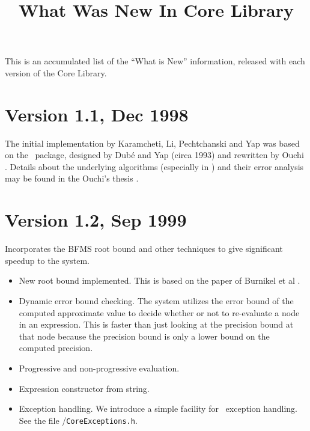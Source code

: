 \documentclass[12pt]{article}
\title{What Was New In Core Library}
\begin{document}
\maketitle

\section*{}
This is an accumulated list of the
``What is New'' information, released with
each version of the Core Library.

\section{Version 1.1, Dec 1998}
The initial implementation
by Karamcheti, Li, Pechtchanski and Yap \cite{klpy:core:98}
was based on the \rexpr\ package,
designed by Dub\'e and Yap (circa 1993)
and rewritten by Ouchi \cite{ouchi:thesis}.  
Details about the underlying 
algorithms (especially in \BF) and their error analysis
may be found in the Ouchi's thesis \cite{ouchi:thesis}.

\section{Version 1.2, Sep 1999}
Incorporates the BFMS root bound and other 
techniques to give significant speedup to the system. 

   \begin{itemize}
   \item{New root bound implemented.}
   This is based on the paper of
   Burnikel et al \cite{mehlhorn-etal:sep-bd:00}. 
   
   \item{Dynamic error bound checking.}
   The system utilizes the error bound of the computed 
   approximate value to decide whether or not
   to re-evaluate a node in an expression.  This is faster than
   just looking at the precision bound at that node because
   the precision bound is only a lower bound on the computed
   precision.
   
   \item{Progressive and non-progressive evaluation.} 
   
   \item{Expression constructor from string.} 
   
   \item{Exception handling.}  We introduce a simple facility
   for \cpp\ exception handling. See the file
   /{\tt CoreExceptions.h}.

   \end{itemize}
\end{document}
